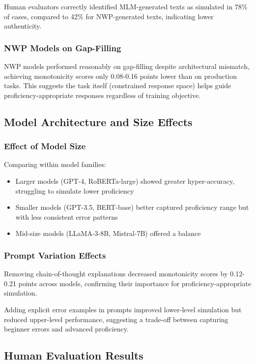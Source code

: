 Human evaluators correctly identified MLM-generated texts as simulated in 78\% of cases, compared to 42\% for NWP-generated texts, indicating lower authenticity.

\subsubsection{NWP Models on Gap-Filling}

NWP models performed reasonably on gap-filling despite architectural mismatch, achieving monotonicity scores only 0.08-0.16 points lower than on production tasks. This suggests the task itself (constrained response space) helps guide proficiency-appropriate responses regardless of training objective.

\subsection{Model Architecture and Size Effects}

\subsubsection{Effect of Model Size}

Comparing within model families:
\begin{itemize}
    \item Larger models (GPT-4, RoBERTa-large) showed greater hyper-accuracy, struggling to simulate lower proficiency
    \item Smaller models (GPT-3.5, BERT-base) better captured proficiency range but with less consistent error patterns
    \item Mid-size models (LLaMA-3-8B, Mistral-7B) offered a balance
\end{itemize}

\subsubsection{Prompt Variation Effects}

Removing chain-of-thought explanations decreased monotonicity scores by 0.12-0.21 points across models, confirming their importance for proficiency-appropriate simulation.

Adding explicit error examples in prompts improved lower-level simulation but reduced upper-level performance, suggesting a trade-off between capturing beginner errors and advanced proficiency.

\subsection{Human Evaluation Results}

